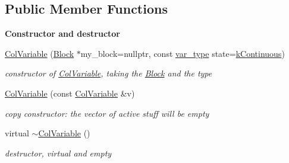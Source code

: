 \subsection*{Public Member Functions}
\begin{Indent}\textbf{ Constructor and destructor}\par
\begin{DoxyCompactItemize}
\item 
\mbox{\hyperlink{class_s_m_spp__di__unipi__it_1_1_col_variable_a437575a777dfea71a3cd92dbd6e358af}{Col\+Variable}} (\mbox{\hyperlink{class_s_m_spp__di__unipi__it_1_1_block}{Block}} $\ast$my\+\_\+block=nullptr, const \mbox{\hyperlink{class_s_m_spp__di__unipi__it_1_1_variable_a32378add5594ab0f1fb45e711d88924d}{var\+\_\+type}} state=\mbox{\hyperlink{class_s_m_spp__di__unipi__it_1_1_col_variable_ae6a9c27f20ec8030a1aef0c5b655c4e1abe6ad916b46098fac21a307ea72f206e}{k\+Continuous}})
\begin{DoxyCompactList}\small\item\em constructor of \mbox{\hyperlink{class_s_m_spp__di__unipi__it_1_1_col_variable}{Col\+Variable}}, taking the \mbox{\hyperlink{class_s_m_spp__di__unipi__it_1_1_block}{Block}} and the type \end{DoxyCompactList}\item 
\mbox{\label{class_s_m_spp__di__unipi__it_1_1_col_variable_a6c65fcf187f1348639856cb6abecc17c}} 
\mbox{\hyperlink{class_s_m_spp__di__unipi__it_1_1_col_variable_a6c65fcf187f1348639856cb6abecc17c}{Col\+Variable}} (const \mbox{\hyperlink{class_s_m_spp__di__unipi__it_1_1_col_variable}{Col\+Variable}} \&v)
\begin{DoxyCompactList}\small\item\em copy constructor\+: the vector of active stuff will be empty \end{DoxyCompactList}\item 
virtual \mbox{\hyperlink{class_s_m_spp__di__unipi__it_1_1_col_variable_ae9ca8b45b9aeb665f8c709bba968956a}{$\sim$\+Col\+Variable}} ()
\begin{DoxyCompactList}\small\item\em destructor, virtual and empty \end{DoxyCompactList}\end{DoxyCompactItemize}
\end{Indent}
